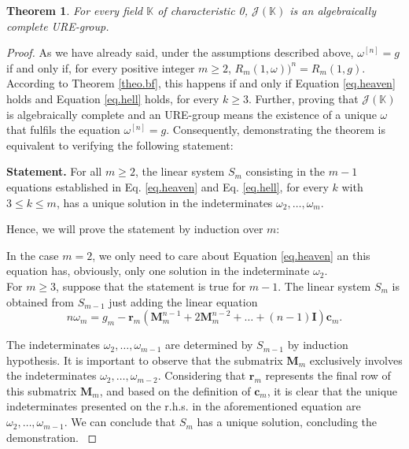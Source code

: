 \documentclass[preprint,12pt]{elsarticle}
\newtheorem{thm}{Theorem}
\begin{document}
\begin{thm} \label{theo.bg} For every field $\mathbb K$ of characteristic 0, $\mathcal J(\mathbb K)$ is an algebraically complete URE-group.


\end{thm}

\begin{proof} As we have already said, under the assumptions described above,  $\omega^{[n]}=g$ if and only if, for every positive integer $m\geq 2$, $R_m(1,\omega))^n=R_m(1,g)$. According to Theorem \ref{theo.bf}, this happens if and only if  Equation \eqref{eq.heaven} holds and Equation \eqref{eq.hell} holds, for every $k\geq 3$. Further, proving that $\mathcal J(\mathbb K)$ is algebraically complete and an URE-group means the existence of a unique $\omega$ that fulfils the equation $\omega^{[n]}=g$. Consequently, demonstrating the theorem is equivalent to verifying the following statement:

\medskip

\noindent \textbf{Statement.} For all $m \geq 2$, the linear system $S_m$ consisting in the $m-1$ equations established in  Eq. \eqref{eq.heaven} and Eq. \eqref{eq.hell}, for every $k$ with  $3\leq k\leq m$, has a unique solution in the indeterminates $\omega_2,\ldots,\omega_m$.

\medskip

\noindent Hence, we will prove the statement by induction over $m$:

\medskip

In the case $m=2$, we only need to care about Equation \eqref{eq.heaven} an this equation has, obviously, only one solution in the indeterminate $\omega_2$.  \\

For $m\geq 3$, suppose that the statement is true for $m-1$. The linear system $S_m$ is obtained from $S_{m-1}$ just adding the linear equation
$$n\omega_m =g_m-\bm r_m(\bm M_m^{n-1}+2\bm M_m^{n-2}+\ldots+ (n-1)\bm I)\bm c_m.$$

\noindent The indeterminates $\omega_2,\ldots, \omega_{m-1}$ are determined by $S_{m-1}$ by induction hypothesis. It is important to observe that the submatrix $\bm M_m$ exclusively involves the indeterminates $\omega_2,\ldots,\omega_{m-2}$. Considering that $\bm r_m$ represents the final row of this submatrix $\bm M_m$, and based on the definition of $\bm c_m$, it is clear that the unique indeterminates presented on the r.h.s. in the aforementioned equation are $\omega_2,\ldots,\omega_{m-1}$. We can conclude that $S_m$ has a unique solution, concluding the demonstration.
$ $
\end{proof}
\end{document}
